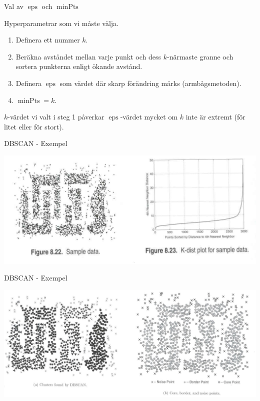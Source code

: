 \documentclass[10pt,english]{beamer}
\begin{document}
\begin{frame}{Val av $\operatorname{eps}$ och $\operatorname{minPts}$}

    Hyperparametrar som vi måste välja.
    \begin{enumerate}
        \item Definera ett nummer $k$.
        \item Beräkna avståndet mellan varje punkt och dess $k$-närmaste granne och sortera punkterna enligt ökande avstånd.
        \item Definera $\operatorname{eps}$ som värdet där skarp förändring märks (armbågsmetoden).
        \item $\operatorname{minPts} = k$.
    \end{enumerate}
    $k$-värdet vi valt i steg 1 påverkar  $\operatorname{eps}$-värdet mycket om $k$ inte är extremt (för litet eller för stort).
    
\end{frame}

\begin{frame}{DBSCAN - Exempel}

    \includegraphics[width=\textwidth]{figs/density_cluster.png}
    
\end{frame}

\begin{frame}{DBSCAN - Exempel}
    
    \includegraphics[width=\textwidth]{figs/DBSCAN_cluster_example.png}

\end{frame}
\end{document}
